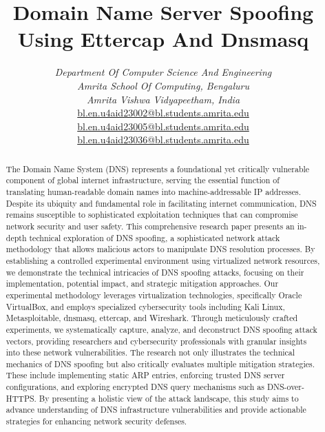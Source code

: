 \documentclass[conference,letterpaper]{IEEEtran}
\begin{document}

\title{Domain Name Server Spoofing Using Ettercap And Dnsmasq}
\author{
\textit{Department Of Computer Science And Engineering} \\
\textit{Amrita School Of Computing, Bengaluru} \\
\textit{Amrita Vishwa Vidyapeetham, India} \\
\href{mailto:bl.en.u4aid23002@bl.students.amrita.edu}{bl.en.u4aid23002@bl.students.amrita.edu} \\
\href{mailto:bl.en.u4aid23005@bl.students.amrita.edu}{bl.en.u4aid23005@bl.students.amrita.edu} \\
\href{mailto:bl.en.u4aid23036@bl.students.amrita.edu}{bl.en.u4aid23036@bl.students.amrita.edu} \\
}

\maketitle

\begin{abstract}
The Domain Name System (DNS) represents a foundational yet critically vulnerable component of global internet infrastructure, serving the essential function of translating human-readable domain names into machine-addressable IP addresses. Despite its ubiquity and fundamental role in facilitating internet communication, DNS remains susceptible to sophisticated exploitation techniques that can compromise network security and user safety.
This comprehensive research paper presents an in-depth technical exploration of DNS spoofing, a sophisticated network attack methodology that allows malicious actors to manipulate DNS resolution processes. By establishing a controlled experimental environment using virtualized network resources, we demonstrate the technical intricacies of DNS spoofing attacks, focusing on their implementation, potential impact, and strategic mitigation approaches.
Our experimental methodology leverages virtualization technologies, specifically Oracle VirtualBox\cite{oracleVirtualBoxGeneralpurposeFull}, and employs specialized cybersecurity tools including Kali Linux, Metasploitable, dnsmasq, ettercap, and Wireshark. Through meticulously crafted experiments, we systematically capture, analyze, and deconstruct DNS spoofing attack vectors, providing researchers and cybersecurity professionals with granular insights into these network vulnerabilities.
The research not only illustrates the technical mechanics of DNS spoofing but also critically evaluates multiple mitigation strategies. These include implementing static ARP entries, enforcing trusted DNS server configurations, and exploring encrypted DNS query mechanisms such as DNS-over-HTTPS. By presenting a holistic view of the attack landscape, this study aims to advance understanding of DNS infrastructure vulnerabilities and provide actionable strategies for enhancing network security defenses.
\end{abstract}
\end{document}
